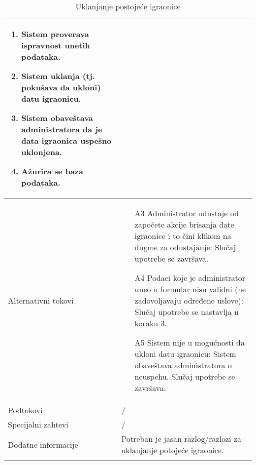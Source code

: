 \documentclass[../main.tex]{subfiles}
\begin{document}
\begin{longtable}{| p{} | p{} |}
\begin{enumerate}
        \item Sistem proverava ispravnost unetih podataka. %
        \item Sistem uklanja (tj. pokušava da ukloni) datu igraonicu.
        \item Sistem obaveštava administratora da je data igraonica uspešno uklonjena.
        \item Ažurira se baza podataka. 
    \end{enumerate}\\
\hline
    Alternativni tokovi & \begin{itemize}
        \item[A3] Administrator odustaje od započete akcije brisanja date igraonice i to čini klikom na dugme za odustajanje: Slučaj upotrebe se završava.
        \item[A4] Podaci koje je administrator uneo u formular nisu validni (ne zadovoljavaju određene uslove): Slučaj upotrebe se nastavlja u koraku 3.
        \item[A5] Sistem nije u mogućnosti da ukloni datu igraonicu: Sistem obaveštava administratora o neuspehu. Slučaj upotrebe se završava.
        
    \end{itemize}\\
\hline
    Podtokovi & /\\
\hline
    Specijalni zahtevi & /\\
\hline
    Dodatne informacije & Potreban je jasan razlog/razlozi za uklanjanje potojeće igraonice.
    \\
\hline
\caption{Uklanjanje postojeće igraonice} %
\end{longtable}
\end{document}
